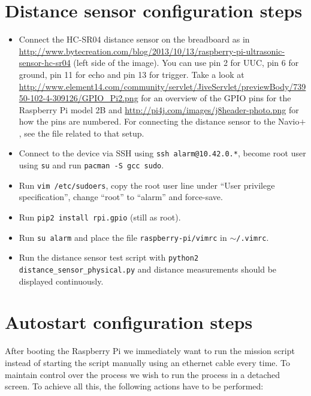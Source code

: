 \documentclass{article}
\newcommand{\navio}{Navio$\stackrel{}{+}$}
\begin{document}
\section{Distance sensor configuration steps}
\begin{itemize}
    \item Connect the HC-SR04 distance sensor on the breadboard as in
          \url{http://www.bytecreation.com/blog/2013/10/13/raspberry-pi-ultrasonic-sensor-hc-sr04}
          (left side of the image). You can use pin 2 for UUC, pin 6 for
          ground, pin 11 for echo and pin 13 for trigger. Take a look at
          \url{http://www.element14.com/community/servlet/JiveServlet/previewBody/73950-102-4-309126/GPIO_Pi2.png}
          for an overview of the GPIO pins for the Raspberry Pi model 2B and
          \url{http://pi4j.com/images/j8header-photo.png} for how the pins are
          numbered. For connecting the distance sensor to the \navio{}, see the 
          file related to that setup.
    \item Connect to the device via SSH using {\tt ssh alarm@10.42.0.*}, become
          root user using {\tt su} and run {\tt pacman -S gcc sudo}.
    \item Run {\tt vim /etc/sudoers}, copy the root user line under ``User
          privilege specification'', change ``root'' to ``alarm'' and
          force-save.
    \item Run {\tt pip2 install rpi.gpio} (still as root).
    \item Run {\tt su alarm} and place the file {\tt raspberry-pi/vimrc} in
          {\tt $\sim$/.vimrc}.
    \item Run the distance sensor test script with {\tt python2 
          distance\_sensor\_physical.py}
          and distance measurements should be displayed continuously.
\end{itemize}

\section{Autostart configuration steps}
After booting the Raspberry Pi we immediately want to run the mission script 
instead of starting the script manually using an ethernet cable every time. To 
maintain control over the process we wish to run the process in a detached 
screen. To achieve all this, the following actions have to be performed:
\end{document}
